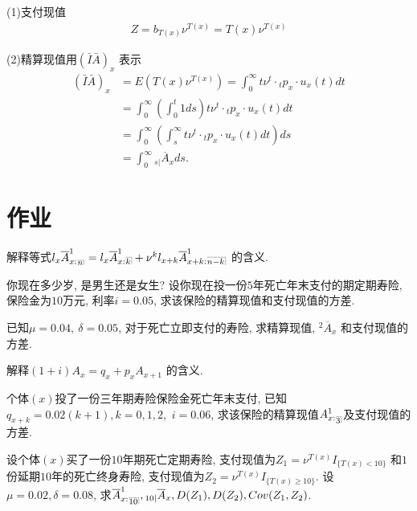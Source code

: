 \documentclass[a4paper,openany, 10pt]{ctexbook}
\makeatletter
\def\z{\left}
\def\y{\right}
\DeclareRobustCommand{\annu}[1]{_{%
    \def\arraystretch{0}%
    \setlength\arraycolsep{1pt}%
    \setlength\arrayrulewidth{.2pt}%
    \begin{array}[b]{@{}c|}\hline
        \\[\arraycolsep]%
        \scriptstyle #1%
    \end{array}%
}}
\makeatother
\begin{document}
(1)支付现值
\begin{align*}
    Z=b_{T(x)}\nu^{T(x)}=T(x)\nu^{T(x)}
\end{align*}

(2)精算现值用$\left( \bar{I}\bar{A} \right) _x$ 表示
\begin{align*}
    \left( \bar{I}\bar{A} \right) _x & =E(T(x)\nu^{T(x)})=\int_0^{\infty}t \nu^t\cdot {}_tp_x\cdot u_x(t)dt                    \\
                                     & =\int_0^{\infty }\z(\int_0^t1ds\y)t \nu^t\cdot {}_tp_x\cdot u_x(t)dt      \\
                                     & =\int_0^{\infty}\z(\int_s^{\infty}t \nu^t\cdot {}_tp_x\cdot u_x(t)dt\y)ds \\
                                     & =\int_0^{\infty} {}_{s|}\overline{A}_x ds.
\end{align*}
\section{作业}
\begin{exs}
    解释等式$l_x\overline{A}_{x:}^1{}_{\annu{n}}=l_x\overline{A}_{x:}^1{}\annu{k}+\nu^kl_{x+k}\overline{A}_{x+k:}^1{}\annu{n-k}$ 的含义.
\end{exs}

\begin{exs}
    你现在多少岁, 是男生还是女生? 设你现在投一份$5$年死亡年末支付的期定期寿险, 保险金为$10$万元, 利率$i = 0.05$, 求该保险的精算现值和支付现值的方差.
\end{exs}

\begin{exs}
    已知$\mu = 0.04, ~\delta = 0.05$, 对于死亡立即支付的寿险, 求精算现值, ${}^2\overline{A}_x$ 和支付现值的方差.
\end{exs}

\begin{exs}
    解释$(1+i){A}_x = q_x + p_x {A}_{x+1}$ 的含义.
\end{exs}

\begin{exs}
    个体$(x)$投了一份三年期寿险保险金死亡年末支付, 已知$q_{x+k}=0.02(k+1),k=0,1,2, $ $i=0.06$, 求该保险的精算现值${A}_{x:}^1{}_{\annu{3}}$及支付现值的方差.
\end{exs}

\begin{exs}
    设个体$(x)$买了一份$10$年期死亡定期寿险, 支付现值为$Z_1=\nu^{T(x)}I_{\{T(x)<10\}}$ 和$1$份延期$10$年的死亡终身寿险, 支付现值为$Z_2=\nu^{T(x)}I_{\{T(x)\ge 10\}}$.
设$\mu=0.02, \delta=0.08$, 求$\overline {A}_{x:}^1{}_{\annu{10}}, {}_{10|}\overline {A}_{x}, D(Z_1), D(Z_2), Cov(Z_1,Z_2)$.
\end{exs}
\end{document}
